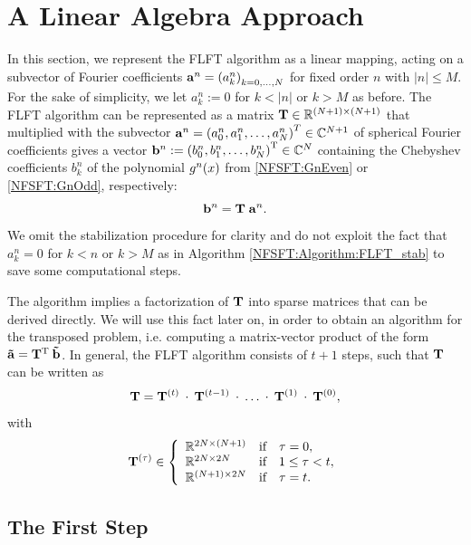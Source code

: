 \section{A Linear Algebra Approach}
\label{DSFT:LinearAlgebra}

In this section, we represent the FLFT algorithm as a linear mapping, acting on a subvector of Fourier coefficients 
$\mathbf{a}^n = \left(a_{k}^n\right)_{k=0,\ldots,N}$ for fixed order $n$ with $|n| \le M$. For the sake of simplicity,
we let $a_{k}^n := 0$ for $k < |n|$ or $k > M$ as before.
The FLFT algorithm can be represented as a matrix $\mathbf{T} \in \mathbb{R}^{(N+1) \times (N+1)}$ that multiplied with the subvector 
$\mathbf{a}^n = \left(a_0^n,a_1^n,\dots,a_N^n\right)^T \in \mathbb{C}^{N+1}$ of spherical Fourier coefficients gives a vector 
$\mathbf{b}^n := \left(b_0^n,b_1^n,\dots,b_{N}^n\right)^{\text{\rm{T}}} \in \mathbb{C}^{N}$ containing the Chebyshev coefficients 
$b_{k}^n$ of the polynomial $g^n{\hspace{-0.4ex}}\left(x\right)$ from \eqref{NFSFT:GnEven} or \eqref{NFSFT:GnOdd}, respectively: 
\[\mathbf{b}^{n} = \mathbf{T} \; \mathbf{a}^n.\] 
We omit the stabilization procedure for clarity and do not exploit the fact that $a_{k}^n = 0$ for 
$k < n$ or $k > M$ as in Algorithm \ref{NFSFT:Algorithm:FLFT_stab} to save some computational steps.

The algorithm implies a factorization of $\mathbf{T}$ into sparse matrices that can be derived directly.
We will use this fact later on, in order to obtain an algorithm for the transposed problem, i.e. computing 
a matrix-vector product of the form $\mathbf{\tilde{a}} = \mathbf{T}^{\text{\rm{T}}}\:\mathbf{\tilde{b}}$. In general, the FLFT algorithm consists 
of $t+1$ steps, such that $\mathbf{T}$ can be written as 
\[
  \mathbf{T} = \mathbf{T}^{(t)} \: \cdot \:  \mathbf{T}^{(t-1)} \: \cdot \: \dots \: \cdot \: \mathbf{T}^{(1)} \: \cdot \:  \mathbf{T}^{(0)},
\]
with
\[
 \V{T}^{(\tau)} \in \left\{\begin{array}{l@{\quad \text{if} \quad}l} \R^{2N \times (N+1)} & \tau = 0, \\ \R^{2N \times 2N} & 1 \le \tau < t, \\ \R^{(N+1) \times 2N} & \tau = t. \end{array}\right.
\]

\subsection{The First Step}

